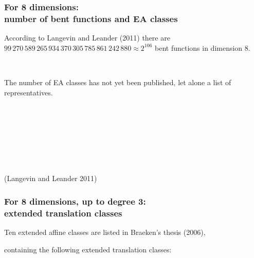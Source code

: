 \documentclass[pdf,sprung,slideColor,nocolorBG]{beamer}
\newenvironment{colortheme}[1]{
\def\ProvidesPackageRCS $##1${\relax}
\renewcommand{\ProcessOptions}{\relax}
\makeatletter

\makeatother
}{}
\newcommand{\slidecite}[1]{\tiny{(#1)}\normalsize{}}
\begin{document}
\begin{colortheme}{seagull}

\begin{frame}
\frametitle{For 8 dimensions: \\ number of bent functions and EA classes}

According to Langevin and Leander (2011)
there are $99\,270\,589\,265\,934\,370\,305\,785\,861\,242\,880 \approx 2^{106}$ bent functions in dimension 8.

~

The number of EA classes has not yet been published, let alone a list of representatives.

~

~

~

~

\slidecite{Langevin and Leander 2011}
\end{frame}

\begin{frame}
\frametitle{For 8 dimensions, up to degree 3: \\ extended translation classes}

Ten extended affine classes are listed in Braeken's thesis (2006),

containing the following extended translation classes:


\end{frame}
\end{colortheme}
\end{document}
